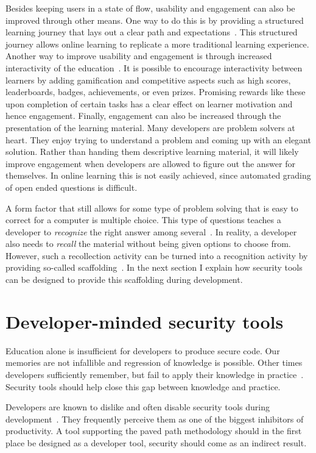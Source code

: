Besides keeping users in a state of flow, usability and engagement can also be improved through other means.
One way to do this is by providing a structured learning journey that lays out a clear path and expectations~\cite{hadi2016driving}.
This structured journey allows online learning to replicate a more traditional learning experience.
Another way to improve usability and engagement is through increased interactivity of the education~\cite{hadi2016driving}.
It is possible to encourage interactivity between learners by adding gamification and competitive aspects such as high scores, leaderboards, badges, achievements, or even prizes.
Promising rewards like these upon completion of certain tasks has a clear effect on learner motivation and hence engagement.
Finally, engagement can also be increased through the presentation of the learning material. Many developers are problem solvers at heart.
They enjoy trying to understand a problem and coming up with an elegant solution.
Rather than handing them descriptive learning material, it will likely improve engagement when developers are allowed to figure out the answer for themselves.
In online learning this is not easily achieved, since automated grading of open ended questions is difficult.

A form factor that still allows for some type of problem solving that is easy to correct for a computer is multiple choice.
This type of questions teaches a developer to \textit{recognize} the right answer among several~\citep{dirksen2015design}.
In reality, a developer also needs to \textit{recall} the material without being given options to choose from. However, such a recollection activity can be turned into a recognition activity by providing so-called scaffolding~\cite{maybin1992scaffolding}. In the next section I explain how security tools can be designed to provide this scaffolding during development.

\section{Developer-minded security tools}
Education alone is insufficient for developers to produce secure code.
Our memories are not infallible and regression of knowledge is possible.
Other times developers sufficiently remember, but fail to apply their knowledge in practice~\cite{xie2011programmers}.
Security tools should help close this gap between knowledge and practice. 

Developers are known to dislike and often disable security tools during development~\cite{shiftleftsurvey}. 
They frequently perceive them as one of the biggest inhibitors of productivity. 
A tool supporting the paved path methodology should in the first place be designed as a developer tool, security should come as an indirect result. 

